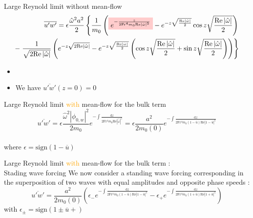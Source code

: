 \documentclass[10pt]{beamer}
\newcommand{\NodeFill}[3]{\tikz[baseline]{\node[fill=#1!20,anchor=base](#2){#3};}}
\begin{document}
\begin{frame}{Large Reynold limit without mean\--flow}
	\begin{align*}
		\overline{u'w'}=\epsilon\frac{\hat{\omega}^{2}a^{2}}{2}\left\{\frac{1}{m_{0}}\left( \NodeFill{red}{}{$e^{-\frac{z}{2\mathrm{Fr^{4}}m_{0}\mathrm{Re}\left\lvert\hat{\omega}\right\rvert^{5}}}$}-e^{-z\sqrt{\frac{\mathrm{Re}\left\lvert\hat{\omega}\right\rvert}{2}}}\cos{z\sqrt{\frac{\mathrm{Re}\left\lvert\hat{\omega}\right\rvert}{2}}} \right)\right.\\
		-\left.\frac{1}{\sqrt{\mathrm{2Re}\left\lvert\hat{\omega}\right\rvert}} \left(e^{-z\sqrt{2\mathrm{Re}\left\lvert\hat{\omega}\right\rvert}}-e^{-z\sqrt{\frac{\mathrm{Re}\left\lvert\hat{\omega}\right\rvert}{2}}} \left(\cos{z\sqrt{\frac{\mathrm{Re}\left\lvert\hat{\omega}\right\rvert}{2}}}+\sin{z\sqrt{\frac{\mathrm{Re}\left\lvert\hat{\omega}\right\rvert}{2}}} \right) \right)\right\}
	\end{align*}
	\begin{itemize}
		\item \NodeFill{red}{}{Bulk streaming}
		\item We have $\overline{u'w'}\left(z=0\right)=0$
	\end{itemize}
\end{frame}

\begin{frame}{Large Reynold limit \textcolor{orange}{with} mean\--flow for the bulk term}
	\begin{equation*}
		\overline{u'w'}=\epsilon\frac{\hat{\omega}^{2}\left\lvert \phi_{0,w} \right\rvert^{2}}{2m_{0}}e^{-\int \frac{\mathrm{d}z}{2\mathrm{Fr^{4}}m_{0}\mathrm{Re}\left\lvert\hat{\omega}\right\rvert^{5}}}=\epsilon\frac{a^{2}}{2m_{0}\left(0\right)}e^{-\int \frac{\mathrm{d}z}{2\mathrm{Fr^{4}}m_{0}\left(1-\overline{u}\right)\mathrm{Re}\left\lvert1-\overline{u}\right\rvert^{5}}}
	\end{equation*}	\\
	where $\epsilon=\mathrm{sign}\left(1-\overline{u}\right)$
\end{frame}

\begin{frame}{Large Reynold limit \textcolor{orange}{with} mean\--flow for the bulk term : \\ Stading wave forcing}
	We now consider a standing wave forcing corresponding in the superposition of two waves with equal amplitudes and opposite phase speeds :
	\begin{equation*}\!\!\!\!\!\!\!\!\!
		\overline{u'w'}=\frac{a^{2}}{2m_{0}\left(0\right)}\left(\epsilon_{-}e^{-\int \frac{\mathrm{d}z}{2\mathrm{Fr^{4}}m_{0}\left(1-\overline{u}\right)\mathrm{Re}\left\lvert1-\overline{u}\right\rvert^{5}}}-\epsilon_{+}e^{-\int \frac{\mathrm{d}z}{2\mathrm{Fr^{4}}m_{0}\left(1+\overline{u}\right)\mathrm{Re}\left\lvert1+\overline{u}\right\rvert^{5}}} \right)
	\end{equation*}	with $\epsilon_{\pm}=\mathrm{sign}\left(1\pm\overline{u}+\right)$
\end{frame}
\end{document}
